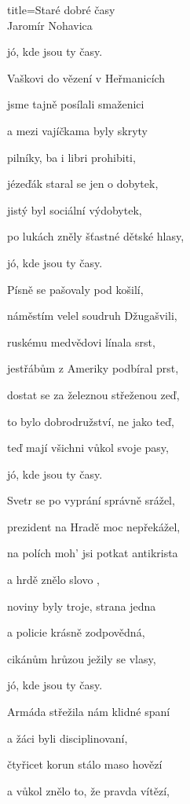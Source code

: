 \begin{song}{title=\predtitle \centering Staré dobré časy \\\large Jaromír Nohavica }
{\begin{centerjustified}
\begin{varwidth}[t]{0.58\textwidth}
jó, kde jsou ty časy.


\end{varwidth}\mezisloupci\begin{varwidth}[t]{0.48\textwidth}\setlength{\parindent}{\pindent}
\vspace*{0.405cm}  %

\sloka
Vaškovi do vězení v Heřmanicích

jsme tajně posílali smaženici

a mezi vajíčkama byly skryty

pilníky, ba i libri prohibiti,

jézeďák staral se jen o dobytek,

jistý byl sociální výdobytek,

po lukách zněly šťastné dětské hlasy,

jó, kde jsou ty časy.

\sloka
Písně se pašovaly pod košilí,

náměstím velel soudruh Džugašvili,

ruskému medvědovi línala srst,

jestřábům z Ameriky podbíral prst,

dostat se za železnou střeženou zeď,

to bylo dobrodružství, ne jako teď,

teď mají všichni vůkol svoje pasy,

jó, kde jsou ty časy.

\sloka
Svetr se po vyprání správně srážel,

prezident na Hradě moc nepřekážel,

na polích moh' jsi potkat antikrista

a hrdě znělo slovo ,

noviny byly troje, strana jedna

a policie krásně zodpovědná,

cikánům hrůzou ježily se vlasy,

jó, kde jsou ty časy.

\sloka
Armáda střežila nám klidné spaní

a žáci byli disciplinovaní,

čtyřicet korun stálo maso hovězí

a vůkol znělo to, že pravda vítězí,


\end{varwidth}
\end{centerjustified}}
\end{song}
